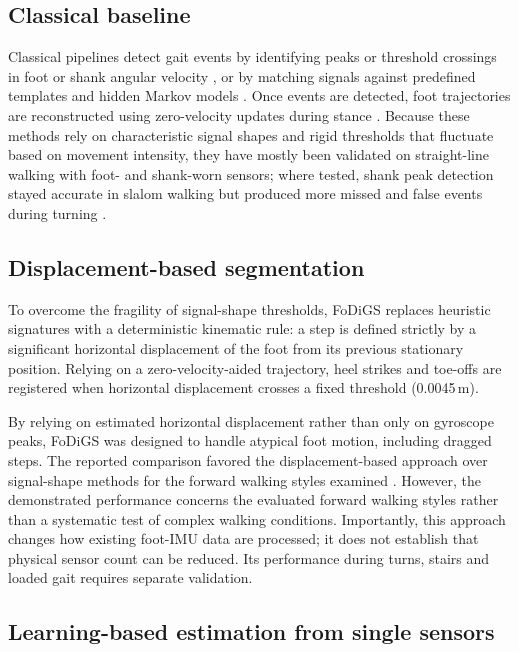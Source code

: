 \documentclass[10pt,a4paper,twocolumn]{article}
\begin{document}
\subsection{Classical baseline}

Classical pipelines detect gait events by identifying peaks or threshold crossings in foot or shank angular velocity \citep{romijnders2021,ruizruiz2024}, or by matching signals against predefined templates and hidden Markov models \citep{kuderle2024}. Once events are detected, foot trajectories are reconstructed using zero-velocity updates during stance \citep{wagstaff2020}. Because these methods rely on characteristic signal shapes and rigid thresholds that fluctuate based on movement intensity, they have mostly been validated on straight-line walking with foot- and shank-worn sensors; where tested, shank peak detection stayed accurate in slalom walking but produced more missed and false events during turning \citep{romijnders2021}.

\subsection{Displacement-based segmentation}

To overcome the fragility of signal-shape thresholds, FoDiGS \citep{ruizruiz2024} replaces heuristic signatures with a deterministic kinematic rule: a step is defined strictly by a significant horizontal displacement of the foot from its previous stationary position. Relying on a zero-velocity-aided trajectory, heel strikes and toe-offs are registered when horizontal displacement crosses a fixed threshold (0.0045\,m).

By relying on estimated horizontal displacement rather than only on gyroscope peaks, FoDiGS was designed to handle atypical foot motion, including dragged steps. The reported comparison favored the displacement-based approach over signal-shape methods for the forward walking styles examined \citep{ruizruiz2024}. However, the demonstrated performance concerns the evaluated forward walking styles rather than a systematic test of complex walking conditions. Importantly, this approach changes how existing foot-IMU data are processed; it does not establish that physical sensor count can be reduced. Its performance during turns, stairs and loaded gait requires separate validation.

\subsection{Learning-based estimation from single sensors}
\end{document}
